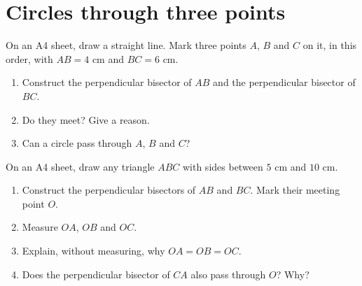 
\section{Circles through three points}

\begin{solvefirst}
  \item On an A4 sheet, draw a straight line. Mark three points $A$, $B$ and $C$ on it, in this order, with $AB=4$ cm and $BC=6$ cm.
  \begin{enumerate}[label=(\alph*),itemsep=1pt]
    \item Construct the perpendicular bisector of $AB$ and the perpendicular bisector of $BC$.
    \item Do they meet? Give a reason.
    \item Can a circle pass through $A$, $B$ and $C$?
  \end{enumerate}
  \item On an A4 sheet, draw any triangle $ABC$ with sides between $5$ cm and $10$ cm.
  \begin{enumerate}[label=(\alph*),itemsep=1pt]
    \item Construct the perpendicular bisectors of $AB$ and $BC$. Mark their meeting point $O$.
    \item Measure $OA$, $OB$ and $OC$.
    \item Explain, without measuring, why $OA=OB=OC$.
    \item Does the perpendicular bisector of $CA$ also pass through $O$? Why?
  \end{enumerate}
\end{solvefirst}

